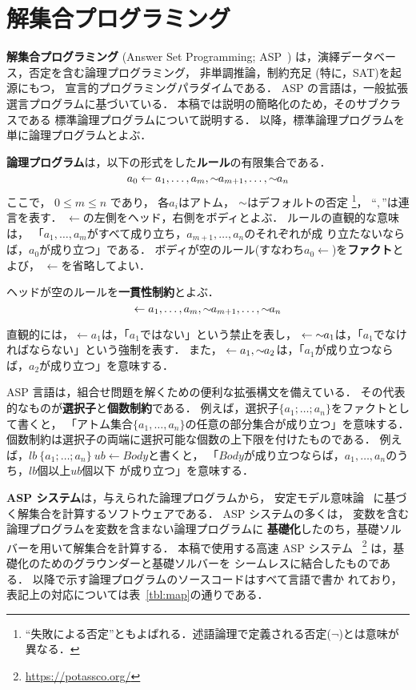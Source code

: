 ﻿\section{解集合プログラミング} \label{chap:asp}

\textbf{解集合プログラミング} (Answer Set Programming; ASP~\cite{%
  Baral03:cambridge,%
  Gelfond88:iclp,%
  Inoue08:jssst,%
  Niemela99:amai})
は，演繹データベース，否定を含む論理プログラミング，
非単調推論，制約充足 (特に，SAT)を起源にもつ，
宣言的プログラミングパラダイムである．
ASP の言語は，一般拡張選言プログラムに基づいている．
本稿では説明の簡略化のため，そのサブクラスである
標準論理プログラムについて説明する．
以降，標準論理プログラムを単に論理プログラムとよぶ．

\textbf{論理プログラム}は，以下の形式をした\textbf{ルール}の有限集合である．
\[
  a_0\leftarrow a_1,\dots,a_m,{\sim\!\!{a_{m+1}}},\dots,{\sim\!\!{a_n}}
\]
ここで，
$0\leq m\leq n$ であり，
各$a_i$はアトム，
${\sim\!\!{}}$はデフォルトの否定
\footnote{``失敗による否定''ともよばれる．述語論理で定義される否定($\neg$)とは意味が異なる．}，
``$,$''は連言を表す．
$\leftarrow$の左側をヘッド，右側をボディとよぶ．
ルールの直観的な意味は，
「$a_1,\ldots,a_m$がすべて成り立ち，$a_{m+1},\ldots,a_n$のそれぞれが成
り立たないならば，$a_0$が成り立つ」である．
ボディが空のルール(すなわち\(a_0\leftarrow\))を\textbf{ファクト}とよび，
$\leftarrow$を省略してよい．

ヘッドが空のルールを\textbf{一貫性制約}とよぶ．
\[
  \leftarrow a_1,\dots,a_m,{\sim\!\!{a_{m+1}}},\dots,{\sim\!\!{a_n}}
\]

直観的には，\(\leftarrow a_1\)は，「$a_1$ではない」という禁止を表し，
\(\leftarrow {\sim\!\!{a_1}}\)は，「$a_1$でなければならない」という強制を表す．
また，
\(\leftarrow a_1, {\sim\!\!{a_{2}}}\)は，「$a_1$が成り立つならば，$a_2$が成り立つ」を意味する．

ASP 言語は，組合せ問題を解くための便利な拡張構文を備えている．
その代表的なものが\textbf{選択子}と\textbf{個数制約}である．
例えば，選択子\(\{a_1;\dots;a_n\}\)をファクトとして書くと，
「アトム集合\(\{a_1,\dots,a_n\}\)の任意の部分集合が成り立つ」を意味する．
個数制約は選択子の両端に選択可能な個数の上下限を付けたものである．
例えば，\(lb\ \{a_1;\dots;a_n\}\ ub \leftarrow Body\)と書くと，
「$Body$が成り立つならば，$a_1,\dots,a_n$のうち，$lb$個以上$ub$個以下
が成り立つ」を意味する．

\textbf{ASP システム}は，与えられた論理プログラムから，
安定モデル意味論~\cite{Gelfond88:iclp}
に基づく解集合を計算するソフトウェアである．
ASP システムの多くは，
変数を含む論理プログラムを変数を含まない論理プログラムに
\textbf{基礎化}したのち，基礎ソルバーを用いて解集合を計算する．
本稿で使用する高速 ASP システム
{\clingo}~\footnote{\url{https://potassco.org/}}
は，基礎化のためのグラウンダー{\gringo}と基礎ソルバー{\clasp}を
シームレスに結合したものである．
以降で示す論理プログラムのソースコードはすべて{\clingo}言語で書か
れており，表記上の対応については表~\ref{tbl:map}の通りである．

